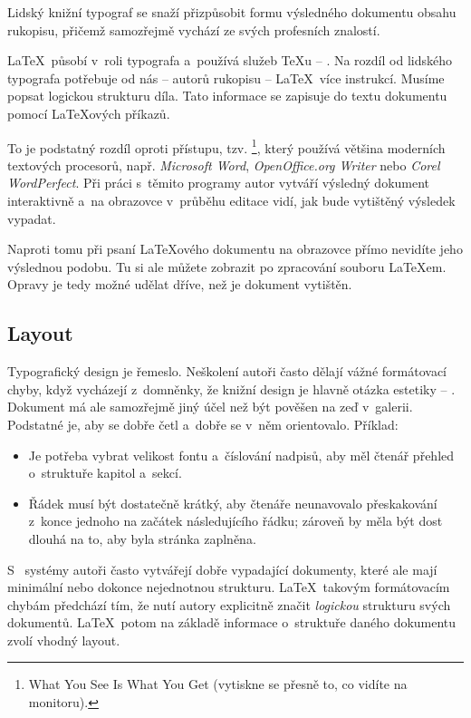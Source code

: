 Lidský knižní typograf se snaží přizpůsobit formu výsledného
dokumentu obsahu rukopisu, přičemž samozřejmě vychází
ze svých profesních znalostí.

\LaTeX\ působí v~roli typografa a~používá služeb \TeX u -- .
Na rozdíl od lidského typografa potřebuje od nás -- autorů rukopisu
-- \LaTeX\ více instrukcí. Musíme popsat logickou strukturu díla.
Tato informace se zapisuje do textu dokumentu pomocí \LaTeX ových příkazů.

To je podstatný rozdíl oproti přístupu, tzv. \footnote{What
You See Is What You Get (vytiskne se přesně to, co vidíte na monitoru).}, který používá
většina moderních textových procesorů, např. \emph{Microsoft Word}, \emph{Open\-Office.org Writer} nebo
\emph{Corel WordPerfect}. Při práci s~těmito programy autor
vytváří výsledný dokument interaktivně a~na obrazovce v~průběhu
editace vidí, jak bude vytištěný výsledek vypadat.

Naproti tomu při psaní \LaTeX ového dokumentu na obrazovce
přímo nevidíte jeho výslednou podobu. Tu si ale můžete zobrazit 
po zpracování souboru \LaTeX em. Opravy je tedy možné udělat
dříve, než je dokument vytištěn.

\subsection{Layout}

Typografický design je řemeslo. Neškolení autoři často dělají
vážné formátovací chyby, když vycházejí z~domněnky, že knižní
design je hlavně otázka estetiky -- . Dokument má ale samozřejmě jiný účel
než být pověšen na zeď v~galerii. Podstatné je, aby se dobře
četl a~dobře se v~něm orientovalo. Příklad:
\begin{itemize}
\item Je potřeba vybrat velikost fontu a~číslování nadpisů, aby
  měl čtenář přehled o~struktuře kapitol a~sekcí.
\item Řádek musí být dostatečně krátký, aby čtenáře neunavovalo
  přeskakování z~konce jednoho na začátek následujícího řádku;
  zároveň by měla být dost dlouhá na to, aby byla stránka zaplněna.
\end{itemize}

S~ systémy autoři často vytvářejí dobře vypadající
dokumenty, které ale mají minimální nebo dokonce nejednotnou
strukturu. \LaTeX\ takovým formátovacím chybám předchází tím,
že nutí autory explicitně značit \emph{logickou} strukturu
svých dokumentů. \LaTeX\ potom na základě informace o~struktuře
daného dokumentu zvolí vhodný layout.

